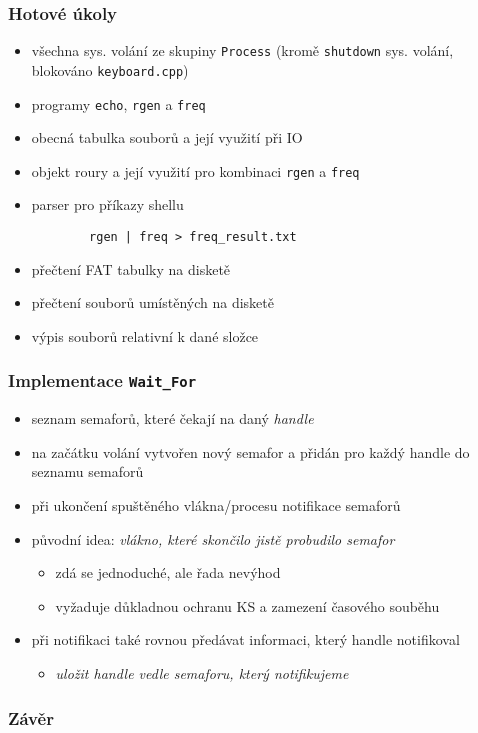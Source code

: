 \documentclass[xcolor=dvipsnames]{beamer}
\begin{document}
\begin{frame}[fragile]
\frametitle{Hotové úkoly}

\begin{itemize}
    \item všechna sys. volání ze skupiny \texttt{Process} (kromě \texttt{shutdown} sys. volání, blokováno \texttt{keyboard.cpp})
    \item programy \texttt{echo}, \texttt{rgen} a \texttt{freq}
    \item obecná tabulka souborů a její využití při IO
    \item objekt roury a její využití pro kombinaci \texttt{rgen} a \texttt{freq}
    \item parser pro příkazy shellu 
    \begin{verbatim}
        rgen | freq > freq_result.txt
    \end{verbatim}
    \item přečtení FAT tabulky na disketě
    \item přečtení souborů umístěných na disketě
    \item výpis souborů relativní k dané složce
\end{itemize}


\end{frame}

\begin{frame}[fragile]
\frametitle{Implementace \texttt{Wait\_For}}
    \begin{itemize}
        \item seznam semaforů, které čekají na daný \textit{handle}
        \item na začátku volání vytvořen nový semafor a přidán pro každý handle do seznamu semaforů
        \item při ukončení spuštěného vlákna/procesu notifikace semaforů
        \item původní idea: \textit{vlákno, které skončilo jistě probudilo semafor}
        \begin{itemize}
            \item zdá se jednoduché, ale řada nevýhod
            \item vyžaduje důkladnou ochranu KS a zamezení časového souběhu
        \end{itemize}
        \item při notifikaci také rovnou předávat informaci, který handle notifikoval
        \begin{itemize}
            \item \textit{uložit handle vedle semaforu, který notifikujeme}
        \end{itemize}   
    \end{itemize}
\end{frame}

\begin{frame}
\frametitle{Závěr}

\end{frame}
\end{document}

